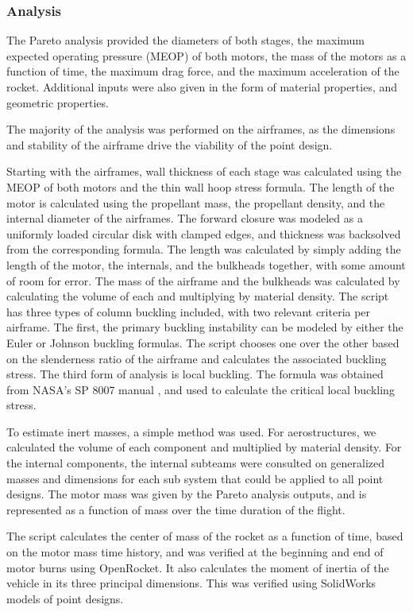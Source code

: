 \subsubsection{Analysis}

The Pareto analysis provided the diameters of both stages, the maximum expected operating pressure (MEOP) of both motors, the mass of the motors as a function of time, the maximum drag force, and the maximum acceleration of the rocket. Additional inputs were also given in the form of material properties, and geometric properties.

The majority of the analysis was performed on the airframes, as the dimensions and stability of the airframe drive the viability of the point design.

Starting with the airframes, wall thickness of each stage was calculated using the MEOP of both motors and the thin wall hoop stress formula. The length of the motor is calculated using the propellant mass, the propellant density, and the internal diameter of the airframes. The forward closure was modeled as a uniformly loaded circular disk with clamped edges, and thickness was backsolved from the corresponding formula. The length was calculated by simply adding the length of the motor, the internals, and the bulkheads together, with some amount of room for error. The mass of the airframe and the bulkheads was calculated by calculating the volume of each and multiplying by material density. The script has three types of column buckling included, with two relevant criteria per airframe. The first, the primary buckling instability can be modeled by either the Euler or Johnson buckling formulas. The script chooses one over the other based on the slenderness ratio of the airframe and calculates the associated buckling stress. The third form of analysis is local buckling. The formula was obtained from NASA’s SP 8007 manual \cite{nasa-sp8007}, and used to calculate the critical local buckling stress.

To estimate inert masses, a simple method was used. For aerostructures, we calculated the volume of each component and multiplied by material density. For the internal components, the internal subteams were consulted on generalized masses and dimensions for each sub system that could be applied to all point designs. The motor mass was given by the Pareto analysis outputs, and is represented as a function of mass over the time duration of the flight.

The script calculates the center of mass of the rocket as a function of time, based on the motor mass time history, and was verified at the beginning and end of motor burns using OpenRocket. It also calculates the moment of inertia of the vehicle in its three principal dimensions. This was verified using SolidWorks models of point designs.



